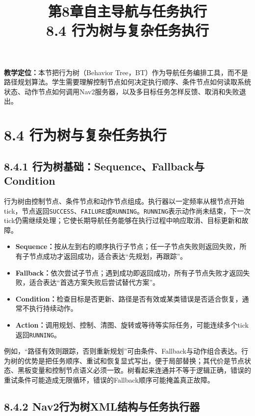 \documentclass[UTF8,zihao=-4]{ctexart}
\title{第8章自主导航与任务执行\\\large 8.4 行为树与复杂任务执行}
\author{}\date{}
\begin{document}
\maketitle

\noindent\textbf{教学定位：}本节把行为树（Behavior Tree，BT）作为导航任务编排工具，而不是路径规划算法。学生需要理解控制节点如何决定执行顺序、条件节点如何读取系统状态、动作节点如何调用Nav2服务器，以及多目标任务怎样反馈、取消和失败退出。

\section*{8.4 行为树与复杂任务执行}

\subsection*{8.4.1 行为树基础：Sequence、Fallback与Condition}

行为树由控制节点、条件节点和动作节点组成。执行器以一定频率从根节点开始tick，节点返回\texttt{SUCCESS}、\texttt{FAILURE}或\texttt{RUNNING}。\texttt{RUNNING}表示动作尚未结束，下一次tick仍需继续处理；它使长期导航任务能够在执行过程中响应取消、目标更新和故障。

\begin{itemize}
  \item \textbf{Sequence：}按从左到右的顺序执行子节点；任一子节点失败则返回失败，所有子节点成功才返回成功，适合表达“先规划，再跟踪”。
  \item \textbf{Fallback：}依次尝试子节点；遇到成功即返回成功，所有子节点失败才返回失败，适合表达“首选方案失败后尝试替代方案”。
  \item \textbf{Condition：}检查目标是否更新、路径是否有效或某类错误是否适合恢复，通常不执行持续动作。
  \item \textbf{Action：}调用规划、控制、清图、旋转或等待等实际任务，可能连续多个tick返回\texttt{RUNNING}。
\end{itemize}

例如，“路径有效则跟踪，否则重新规划”可由条件、Fallback与动作组合表达。行为树的优势是把任务顺序、重试和恢复显式写出，便于局部替换；其代价是节点状态、黑板变量和控制节点语义必须一致。树看起来连通并不等于逻辑正确，错误的重试条件可能造成无限循环，错误的Fallback顺序可能掩盖真正故障。

\subsection*{8.4.2 Nav2行为树XML结构与任务执行器}
\end{document}
